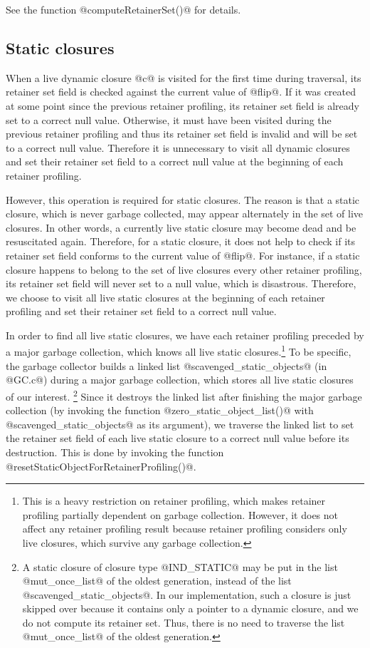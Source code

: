 \documentclass{article}
\begin{document}
See the function @computeRetainerSet()@ for details.

\subsection{Static closures}

When a live dynamic closure @c@ is visited for the first time during traversal,
its retainer set field is checked against the current value of @flip@.
If it was created at some point since the previous retainer profiling, 
its retainer set field is already set to a correct null value. 
Otherwise, it must have been visited 
during the previous retainer profiling and thus its retainer set field is
invalid and will be set to a correct null value. 
Therefore it is unnecessary to visit all dynamic closures and set their
retainer set field to a correct null value at the beginning of each retainer 
profiling.

However, this operation is required for static closures. 
The reason is that a static closure, which is never garbage collected,
may appear alternately in the set of live closures.
In other words, a currently live static closure may become dead and 
be resuscitated again.
Therefore, for a static closure, it does not help to check if its
retainer set field conforms to the current value of @flip@. 
For instance, 
if a static closure happens to belong to the set of live closures every other 
retainer profiling, its retainer set field will never set to a null value,
which is disastrous.
Therefore, we choose to visit all live static closures at the beginning
of each retainer profiling and set their retainer set field to a 
correct null value. 

In order to find all live static closures, we have each retainer 
profiling preceded by a major garbage collection, which knows all live
static closures.\footnote{This is a heavy 
restriction on retainer profiling, which makes retainer profiling partially
dependent on garbage collection. 
However, it does not affect any retainer profiling result because 
retainer profiling considers only live closures, which survive any
garbage collection.} 
To be specific, the garbage collector builds a linked list
@scavenged_static_objects@ (in @GC.c@) during a major garbage collection,
which stores all live static closures of our interest.
\footnote{
A static closure of closure type @IND\_STATIC@ may be put in the
list @mut\_once\_list@ of the oldest generation, instead of the list
@scavenged\_static\_objects@. 
In our implementation, such a closure is just skipped over because it
contains only a pointer to a dynamic closure, and we do not compute
its retainer set.
Thus, there is no need to traverse the list @mut\_once\_list@ of the oldest 
generation.}
Since it destroys the linked list after finishing the major garbage collection
(by invoking the function @zero_static_object_list()@ with 
@scavenged_static_objects@ as its argument),
we traverse the linked list to set the retainer set field of each
live static closure to a correct null value before its destruction.
This is done by invoking the function 
@resetStaticObjectForRetainerProfiling()@.
\end{document}
